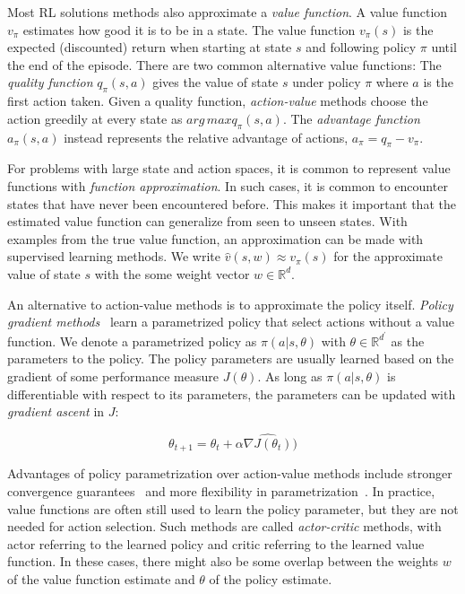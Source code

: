 Most RL solutions methods also approximate a \textit{value function}.
A value function \(v_\pi\) estimates how good it is to be in a state.
The value function \(v_\pi(s)\) is the expected (discounted) return when starting at state \(s\) and following policy \(\pi\) until the end of the episode.
There are two common alternative value functions:
The \textit{quality function} \(q_\pi(s,a)\) gives the value of state \(s\) under policy \(\pi\) where \(a\) is the first action taken.
Given a quality function, \textit{action-value} methods choose the action greedily at every state as \(arg\,max q_\pi(s, a)\).
The \textit{advantage function} \(a_\pi(s, a)\) instead represents the relative advantage of actions, \(a_\pi = q_\pi - v_\pi\).~\cite{sutton_reinforcement_2018}

For problems with large state and action spaces, it is common to represent value functions with \textit{function approximation}.
In such cases, it is common to encounter states that have never been encountered before.
This makes it important that the estimated value function can generalize from seen to unseen states.
With examples from the true value function, an approximation can be made with supervised learning methods.
We write \(\hat{v}(s,w) \approx v_\pi(s)\) for the approximate value of state \(s\) with the some weight vector \(w \in \mathbb{R}^d\).~\cite{sutton_reinforcement_2018}

An alternative to action-value methods is to approximate the policy itself.
\textit{Policy gradient methods}~\cite{sutton_policygrad_1999} learn a parametrized policy that select actions without a value function.
We denote a parametrized policy as \(\pi(a|s,\theta)\) with \(\theta \in \mathbb{R}^{d^\prime}\) as the parameters to the policy.
The policy parameters are usually learned based on the gradient of some performance measure \(J(\theta)\).
As long as \(\pi(a|s,\theta)\) is differentiable with respect to its parameters, the parameters can be updated with \textit{gradient ascent} in \(J\):

\[
    \theta_{t+1} = \theta_t + \alpha \hat{\nabla J(\theta_t)}) 
\]

Advantages of policy parametrization over action-value methods include stronger convergence guarantees~\cite{sutton_policygrad_1999} and more flexibility in parametrization~\cite{sutton_reinforcement_2018}. In practice, value functions are often still used to learn the policy parameter, but they are not needed for action selection.
Such methods are called \textit{actor-critic} methods, with actor referring to the learned policy and critic referring to the learned value function.
In these cases, there might also be some overlap between the weights \(w\) of the value function estimate and \(\theta\) of the policy estimate. 

